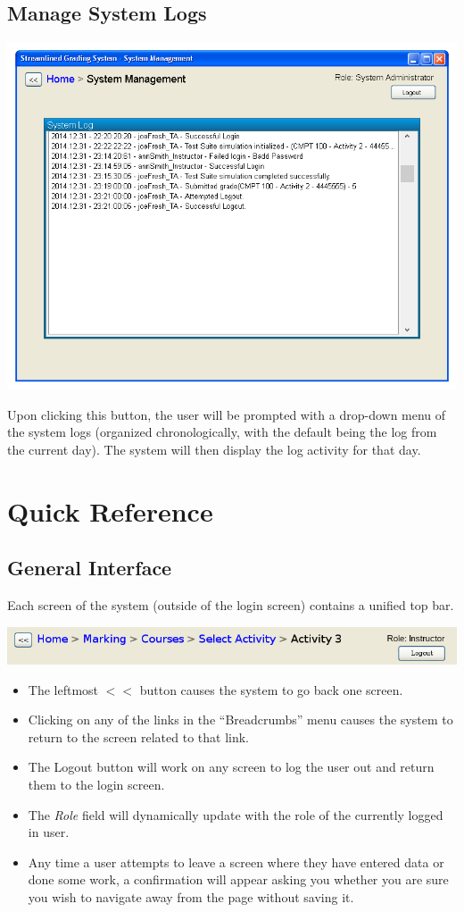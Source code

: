\documentclass{article}
\begin{document}
\subsection{Manage System Logs}
\centerline{\includegraphics[scale=0.55]{../images/UIMockups/pngs/systemManagement}}
\label{manageLogs}
Upon clicking this button, the user will be prompted with a drop-down menu of
the system logs (organized chronologically, with the default being the log
from the current day). The system will then display the log activity for
that day.

\section{Quick Reference}  %
\subsection{General Interface}
Each screen of the system (outside of the login screen) contains a unified top bar. \\
\centerline{\includegraphics[scale=0.55]{../images/UIMockups/pngs/topBar}}
\begin{itemize}
  \item The leftmost $<<$ button causes the system to go back one screen. 
  \item Clicking on any of the links in the ``Breadcrumbs'' menu causes the system 
    to return to the screen related to that link. 
  \item The Logout button will work on any screen to log the user out and return
    them to the login screen.
  \item The \emph{Role} field will dynamically update with the role of the currently logged
    in user.
  \item Any time a user attempts to leave a screen where they have entered data or
    done some work, a confirmation will appear asking you whether you are sure
    you wish to navigate away from the page without saving it.
\end{itemize}
\end{document}
